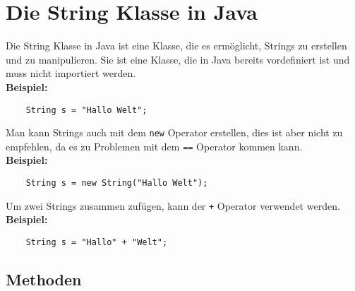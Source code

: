 \documentclass[a4paper, 12pt]{report}
\begin{document}
    \renewcommand{\baselinestretch}{1.5}
    \chapter*{Die String Klasse in Java}
    Die String Klasse in Java ist eine Klasse, die es ermöglicht, Strings zu erstellen und zu manipulieren.
    Sie ist eine Klasse, die in Java bereits vordefiniert ist und muss nicht importiert werden.\\
    \textbf{Beispiel:}
    \begin{verbatim}
    String s = "Hallo Welt";
    \end{verbatim}
    Man kann Strings auch mit dem \texttt{new} Operator erstellen, dies ist aber nicht zu empfehlen, da es zu Problemen mit dem \texttt{==} Operator kommen kann.\\
    \textbf{Beispiel:}
    \begin{verbatim}
    String s = new String("Hallo Welt");
    \end{verbatim}
    Um zwei Strings zusammen zufügen, kann der \texttt{+} Operator verwendet werden.\\
    \textbf{Beispiel:}
    \begin{verbatim}
    String s = "Hallo" + "Welt";
    \end{verbatim}


    \section*{Methoden}
\end{document}
